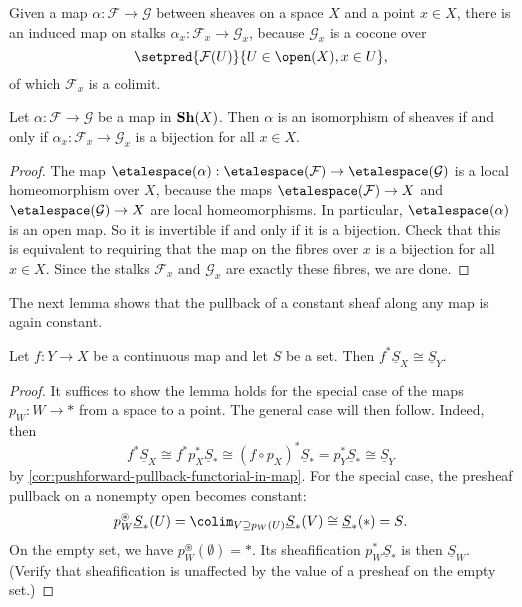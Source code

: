 Given a map $\alpha\colon \mathcal{F} \to \mathcal{G}$ between sheaves on a space $X$ and a point $x \in X$, there is an induced map on stalks $\alpha_x\colon \mathcal{F}_x \to \mathcal{G}_x$, because $\mathcal{G}_x$ is a cocone over
\[\setpred{\mathcal{F}(U)}{U \in \open(X),x \in U}\text{,}\]
of which $\mathcal{F}_x$ is a colimit.

\begin{lem}\label{lem:stalkwise-check-isomorphism}
    Let $\alpha\colon \mathcal{F} \to \mathcal{G}$ be a map in $\operatorname{\mathbf{Sh}}(X)$.
    Then $\alpha$ is an isomorphism of sheaves if and only if $\alpha_x\colon \mathcal{F}_x \to \mathcal{G}_x$ is a bijection for all $x \in X$.
\end{lem}
\begin{proof}
    The map $\etalespace(\alpha)\colon \etalespace(\mathcal{F}) \to \etalespace(\mathcal{G})$ is a local homeomorphism over $X$, because the maps $\etalespace(\mathcal{F}) \to X$ and $\etalespace(\mathcal{G}) \to X$ are local homeomorphisms. In particular, $\etalespace(\alpha)$ is an open map. So it is invertible if and only if it is a bijection. Check that this is equivalent to requiring that the map on the fibres over $x$ is a bijection for all $x \in X$. Since the stalks $\mathcal{F}_x$ and $\mathcal{G}_x$ are exactly these fibres, we are done.
\end{proof}

The next lemma shows that the pullback of a constant sheaf along any map is again constant.

\begin{lem}
	Let $f: Y \to X$ be a continuous map and let $S$ be a set. Then $f^*\underline{S}_X \cong \underline{S}_Y$.
\end{lem}
\begin{proof}
  It suffices to show the lemma holds for the special case of the maps $p_W: W \to *$ from a space to a point. The general case will then follow. Indeed, then \[f^*\underline{S}_X \cong f^* p_X^* \underline{S}_* \cong (f \circ p_X)^* \underline{S}_* = p_Y^* \underline{S}_* \cong \underline{S}_Y\]
  by \cref{cor:pushforward-pullback-functorial-in-map}.
  For the special case, the presheaf pullback on a nonempty open becomes constant: \[p_W^\circledast \underline{S}_*(U) = \colim_{V \supseteq p_W(U)}\underline{S}_*(V) \cong \underline{S}_*(*) = S\text{.}\] On the empty set, we have $p_W^\circledast(\emptyset) = *$.
  Its sheafification $p_W^*\underline{S}_*$ is then $\underline{S}_W$. (Verify that sheafification is unaffected by the value of a presheaf on the empty set.)
  \end{proof}

